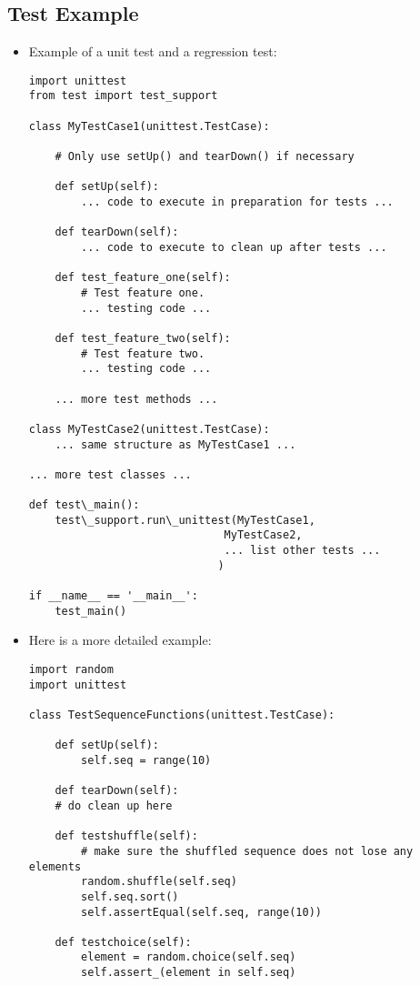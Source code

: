 \subsection{Test Example}
\begin{itemize}

  \item
    Example of a unit test and a regression test:
    \begin{verbatim}import unittest
from test import test_support

class MyTestCase1(unittest.TestCase):

    # Only use setUp() and tearDown() if necessary

    def setUp(self):
        ... code to execute in preparation for tests ...

    def tearDown(self):
        ... code to execute to clean up after tests ...

    def test_feature_one(self):
        # Test feature one.
        ... testing code ...

    def test_feature_two(self):
        # Test feature two.
        ... testing code ...

    ... more test methods ...

class MyTestCase2(unittest.TestCase):
    ... same structure as MyTestCase1 ...

... more test classes ...

def test\_main():
    test\_support.run\_unittest(MyTestCase1,
                              MyTestCase2,
                              ... list other tests ...
                             )

if __name__ == '__main__':
    test_main()
    \end{verbatim}

  \item
    Here is a more detailed example:    \begin{verbatim}
import random
import unittest

class TestSequenceFunctions(unittest.TestCase):
    
    def setUp(self):
        self.seq = range(10)

    def tearDown(self):
	# do clean up here

    def testshuffle(self):
        # make sure the shuffled sequence does not lose any elements
        random.shuffle(self.seq)
        self.seq.sort()
        self.assertEqual(self.seq, range(10))

    def testchoice(self):
        element = random.choice(self.seq)
        self.assert_(element in self.seq)


\end{verbatim}
\end{itemize}

